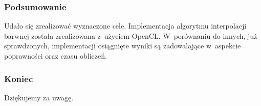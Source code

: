 \documentclass{beamer}
\begin{document}
\begin{frame}
  \frametitle{Podsumowanie}
  Udało się zrealizować wyznaczone cele. Implementacja algorytmu interpolacji barwnej została zrealizowana z~użyciem OpenCL. W~porównaniu do innych, już sprawdzonych, implementacji osiągnięte wyniki są zadowalające w~aspekcie poprawności oraz czasu obliczeń.
\end{frame}

\begin{frame}
  \frametitle{Koniec}
\begin{center}
Dziękujemy za uwagę.
\end{center}
\end{frame}
\end{document}
